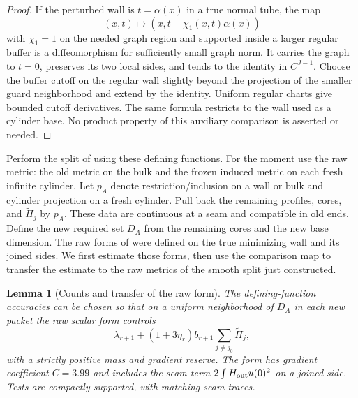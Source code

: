 \documentclass[11pt]{article}
\numberwithin{equation}{section}
\newtheorem{lemma}[theorem]{Lemma}
\theoremstyle{definition}
\theoremstyle{remark}
\begin{document}
\begin{proof}
If the perturbed wall is $t=\alpha(x)$ in a true normal tube, the map
\[
 (x,t)\longmapsto (x,t-\chi_1(x,t)\alpha(x))
\]
with $\chi_1=1$ on the needed graph region and supported inside a larger
regular buffer is a diffeomorphism for sufficiently small graph norm.
It carries the graph to $t=0$, preserves its two local sides, and tends
to the identity in $C^{J-1}$.  Choose the buffer cutoff on the regular
wall slightly beyond the projection of the smaller guard neighborhood
and extend by the identity.  Uniform regular charts give bounded
cutoff derivatives.  The same formula restricts to the wall used as a
cylinder base.  No product property of this auxiliary comparison is
asserted or needed.
\end{proof}

Perform the split of  using these defining functions.
For the moment use the raw metric: the old metric on the bulk and the
frozen induced metric on each fresh infinite cylinder.  Let $p_A$ denote
restriction/inclusion on a wall or bulk and cylinder projection on a
fresh cylinder.  Pull back the remaining profiles, cores, and
$\widetilde\Pi_j$ by $p_A$.  These data are continuous at a seam and
compatible in old ends.  Define the new required set $D_A$ from the
remaining cores and the new base dimension.
The raw forms of  were defined on the true
minimizing wall and its joined sides.  We first estimate those forms,
then use the comparison map to transfer the estimate to the raw metrics
of the smooth split just constructed.

\begin{lemma}[Counts and transfer of the raw form]\label{regular:transfer}
The defining-function accuracies can be chosen so that on a uniform
neighborhood of $D_A$ in each new packet the raw scalar form controls
\begin{equation}\label{regular:raw-target}
 \lambda_{r+1}+(1+3\eta_r)b_{r+1}\sum_{j\ne j_0}\widetilde\Pi_j,
\end{equation}
with a strictly positive mass and gradient reserve.  The form has
gradient coefficient $C=3.99$ and includes the seam term
$2\int H_{\rm out}u(0)^2$ on a joined side.  Tests are compactly
supported, with matching seam traces.
\end{lemma}
\end{document}

